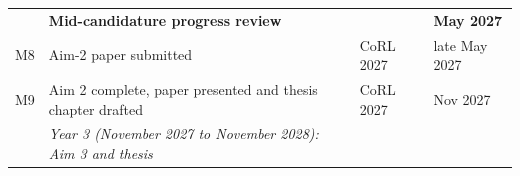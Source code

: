 \documentclass[
  11pt,
]{article}
\begin{document}
\begin{longtable}[]{@{}llll@{}}
\begin{minipage}[t]{0.06\columnwidth}
\end{minipage} & \begin{minipage}[t]{0.49\columnwidth}\raggedright
\textbf{Mid-candidature progress review}\strut
\end{minipage} & \begin{minipage}[t]{0.19\columnwidth}\raggedright
\strut
\end{minipage} & \begin{minipage}[t]{0.15\columnwidth}\raggedright
\textbf{May 2027}\strut
\end{minipage}\tabularnewline
\begin{minipage}[t]{0.06\columnwidth}\raggedright
M8\strut
\end{minipage} & \begin{minipage}[t]{0.49\columnwidth}\raggedright
Aim-2 paper submitted\strut
\end{minipage} & \begin{minipage}[t]{0.19\columnwidth}\raggedright
CoRL 2027\strut
\end{minipage} & \begin{minipage}[t]{0.15\columnwidth}\raggedright
late May 2027\strut
\end{minipage}\tabularnewline
\begin{minipage}[t]{0.06\columnwidth}\raggedright
M9\strut
\end{minipage} & \begin{minipage}[t]{0.49\columnwidth}\raggedright
Aim 2 complete, paper presented and thesis chapter drafted\strut
\end{minipage} & \begin{minipage}[t]{0.19\columnwidth}\raggedright
CoRL 2027\strut
\end{minipage} & \begin{minipage}[t]{0.15\columnwidth}\raggedright
Nov 2027\strut
\end{minipage}\tabularnewline
\begin{minipage}[t]{0.06\columnwidth}\raggedright
\strut
\end{minipage} & \begin{minipage}[t]{0.49\columnwidth}\raggedright
\emph{Year 3 (November 2027 to November 2028): Aim 3 and thesis}\strut
\end{minipage} & \begin{minipage}[t]{0.19\columnwidth}\raggedright
\strut
\end{minipage} & \begin{minipage}[t]{0.15\columnwidth}\raggedright
\strut
\end{minipage}\tabularnewline

\end{longtable}
\end{document}
